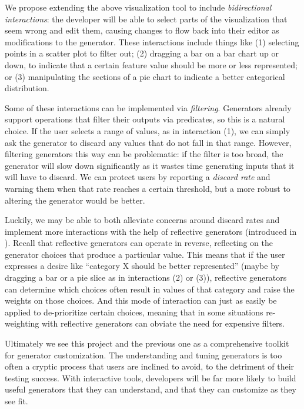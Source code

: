 We propose extending the above visualization tool to include {\em bidirectional
interactions}: the developer will be able to select parts of the visualization
that seem wrong and edit them, causing changes to flow back into their editor as
modifications to the generator. These interactions include things like (1)
selecting points in a scatter plot to filter out; (2) dragging a bar on a bar
chart up or down, to indicate that a certain feature value should be more or
less represented; or (3) manipulating the sections of a pie chart to indicate
a better categorical distribution.

Some of these interactions can be implemented via {\em filtering}. Generators
already support operations that filter their outputs via predicates, so this is
a natural choice. If the user selects a range of values, as in interaction (1),
we can simply ask the generator to discard any values that do not fall in that
range.  However, filtering generators this way can be problematic: if the filter
is too broad, the generator will slow down significantly as it wastes time
generating inputs that it will have to discard.  We can protect users by
reporting a {\em discard rate} and warning them when that rate reaches a certain
threshold, but a more robust to altering the generator would be better.

Luckily, we may be able to both alleviate concerns around discard rates and
implement more interactions with the help of reflective generators (introduced
in ). Recall that reflective generators can operate in
reverse, reflecting on the generator choices that produce a particular value.
This means that if the user expresses a desire like ``category X should be
better represented'' (maybe by dragging a bar or a pie slice as in interactions
(2) or (3)), reflective generators can determine which choices often result in
values of that category and raise the weights on those choices. And this mode of
interaction can just as easily be applied to de-prioritize certain choices,
meaning that in some situations re-weighting with reflective generators can
obviate the need for expensive filters.

Ultimately we see this project and the previous one as a comprehensive toolkit
for generator customization. The understanding and tuning generators is too
often a cryptic process that users are inclined to avoid, to the detriment of
their testing success. With interactive tools, developers will be far more
likely to build useful generators that they can understand, and that they can
customize as they see fit.

